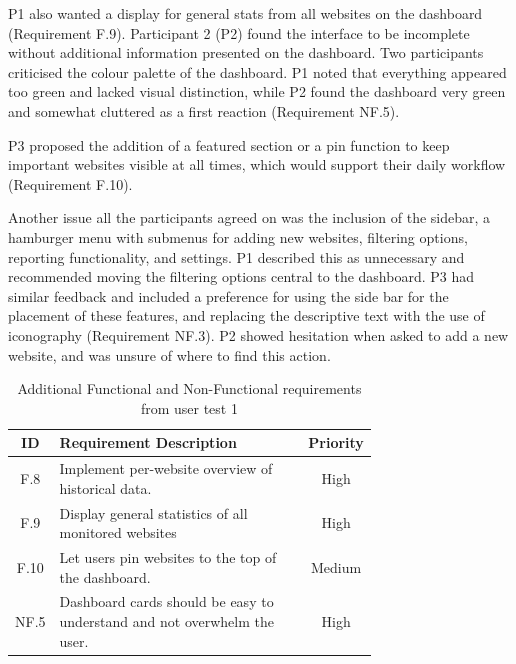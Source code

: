P1 also wanted a display for general stats from all websites on the dashboard (Requirement F.9).  Participant 2 (P2) found the interface to be incomplete without additional information presented on the dashboard. Two participants criticised the colour palette of the dashboard. P1 noted that everything appeared too green and lacked visual distinction, while P2 found the dashboard very green and somewhat cluttered as a first reaction (Requirement NF.5).

P3 proposed the addition of a featured section or a pin function to keep important websites visible at all times, which would support their daily workflow (Requirement F.10). 

Another issue all the participants agreed on was the inclusion of the sidebar, a hamburger menu with submenus for adding new websites, filtering options, reporting functionality, and settings. P1 described this as unnecessary and recommended moving the filtering options central to the dashboard. P3 had similar feedback and included a preference for using the side bar for the placement of these features, and replacing the descriptive text with the use of iconography (Requirement NF.3). P2 showed hesitation when asked to add a new website, and was unsure of where to find this action.



\begin{table}[H]
    \centering
    \begin{tabular}{|c|p{0.72\linewidth}|c|} \hline
    \textbf{ID} & \textbf{Requirement Description} & \textbf{Priority} \\ \hline
         F.8 &  Implement per-website overview of historical data.& High\\ \hline 
         F.9 &  Display general statistics of all monitored websites & High\\ \hline 
         F.10 & Let users pin websites to the top of the dashboard.&Medium\\\hline
         NF.5 &  Dashboard cards should be easy to understand and not overwhelm the user.& High\\ \hline
    \end{tabular}
    \caption{Additional Functional and Non-Functional requirements from user test 1}
    \label{tab:f_req_usertest_1}
\end{table}



